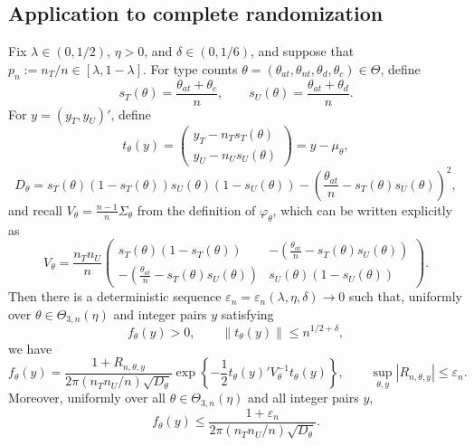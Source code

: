 \documentclass[12pt,reqno]{amsart}
\begin{document}
\subsection{Application to complete randomization}
\label{sec:application}

\begin{lem}\label{lem:ftheta-ratio}
Fix \(\lambda\in(0,1/2)\), \(\eta>0\), and \(\delta\in(0,1/6)\), and suppose that
\(p_n:=n_T/n\in[\lambda,1-\lambda]\).  For type counts
\(\theta=(\theta_{at},\theta_{nt},\theta_d,\theta_c) \in \Theta\),
define
\[
s_T(\theta)=\frac{\theta_{at}+\theta_c}{n},
\qquad
s_U(\theta)=\frac{\theta_{at}+\theta_d}{n}.
\]
For \(y=(y_T,y_U)'\), define
\[
t_\theta(y)=
\begin{pmatrix}
y_T-n_Ts_T(\theta)\\
y_U-n_Us_U(\theta)
\end{pmatrix}
= y - \mu_\theta,
\]
\[
D_\theta
=s_T(\theta)(1-s_T(\theta))s_U(\theta)(1-s_U(\theta))
-\left(\frac{\theta_{at}}n-s_T(\theta)s_U(\theta)\right)^2,
\]
and recall \(V_\theta = \tfrac{n-1}{n}\Sigma_\theta\) from the definition of \(\varphi_\theta\), which can be written explicitly as
\[
V_\theta
=
\frac{n_Tn_U}{n}
\begin{pmatrix}
s_T(\theta)(1-s_T(\theta))
& -\left(\frac{\theta_{at}}n-s_T(\theta)s_U(\theta)\right)\\
-\left(\frac{\theta_{at}}n-s_T(\theta)s_U(\theta)\right)
& s_U(\theta)(1-s_U(\theta))
\end{pmatrix}.
\]
Then there is a deterministic sequence
\(\varepsilon_n=\varepsilon_n(\lambda,\eta,\delta)\to0\) such that, uniformly
over \(\theta\in\Theta_{3,n}(\eta)\) and integer pairs \(y\) satisfying
\[
f_\theta(y)>0,\qquad \|t_\theta(y)\|\le n^{1/2+\delta},
\]
we have
\[
f_\theta(y)
=
\frac{1+R_{n,\theta,y}}
{2\pi (n_Tn_U/n)\sqrt{D_\theta}}
\exp\left\{-\frac12t_\theta(y)'V_\theta^{-1}t_\theta(y)\right\},
\qquad
\sup_{\theta,y}|R_{n,\theta,y}|\le\varepsilon_n.
\]
Moreover, uniformly over all \(\theta\in\Theta_{3,n}(\eta)\) and all integer
pairs \(y\),
\[
f_\theta(y)
\le
\frac{1+\varepsilon_n}
{2\pi (n_Tn_U/n)\sqrt{D_\theta}}.
\]
\end{lem}
\end{document}
